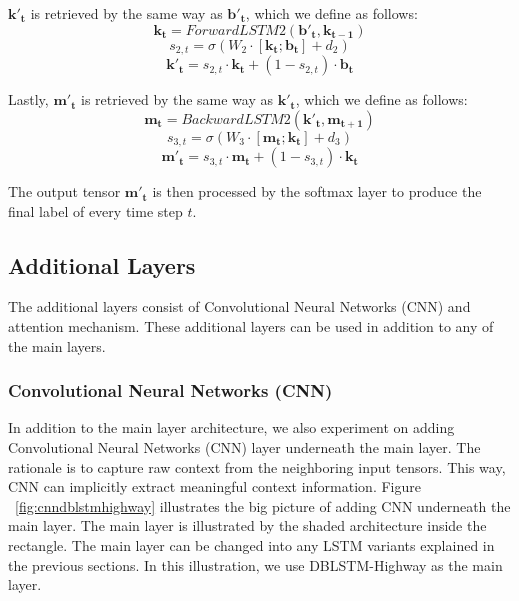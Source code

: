 $\mathbf{k'_{t}}$ is retrieved by the same way as $\mathbf{b'_{t}}$, which we define as follows:
\begin{equation}
\label{eq:forwardhighway2}
\mathbf{k_{t}} = ForwardLSTM2(\mathbf{b'_{t}}, \mathbf{k_{t-1}})
\end{equation}
\begin{equation}
s_{2,t} = \sigma(W_{2} \cdot [\mathbf{k_{t}}; \mathbf{b_{t}}] + d_{2})
\end{equation}
\begin{equation}
\mathbf{k'_{t}} = s_{2,t} \cdot \mathbf{k_{t}} + (1 - s_{2,t}) \cdot \mathbf{b_{t}} 
\end{equation}

Lastly, $\mathbf{m'_{t}}$ is retrieved by the same way as $\mathbf{k'_{t}}$, which we define as follows:
\begin{equation}
\label{eq:backwardhighway2}
\mathbf{m_{t}} = BackwardLSTM2(\mathbf{k'_{t}}, \mathbf{m_{t+1}})
\end{equation}
\begin{equation}
s_{3,t} = \sigma(W_{3} \cdot [\mathbf{m_{t}}; \mathbf{k_{t}}] + d_{3})
\end{equation}
\begin{equation}
\mathbf{m'_{t}} = s_{3,t} \cdot \mathbf{m_{t}} + (1 - s_{3,t}) \cdot \mathbf{k_{t}} 
\end{equation}

The output tensor $\mathbf{m'_{t}}$ is then processed by the softmax layer to produce the final label of every time step $t$.

\subsection{Additional Layers}
The additional layers consist of Convolutional Neural Networks (CNN) and attention mechanism. These additional layers can be used in addition to any of the main layers.

\subsubsection{Convolutional Neural Networks (CNN)}
In addition to the main layer architecture, we also experiment on adding Convolutional Neural Networks (CNN) layer underneath the main layer. The rationale is to capture raw context from the neighboring input tensors. This way, CNN can implicitly extract meaningful context information. Figure ~\ref{fig:cnndblstmhighway} illustrates the big picture of adding CNN underneath the main layer. The main layer is illustrated by the shaded architecture inside the rectangle. The main layer can be changed into any LSTM variants explained in the previous sections. In this illustration, we use DBLSTM-Highway as the main layer.

